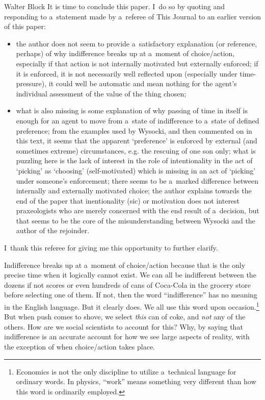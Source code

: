 \begin{artengenv}{Walter Block}
It is time to conclude this paper. I~do so by quoting and responding to a~statement made by a~referee of This Journal to an earlier version of this paper:
\small{
\begin{itemize}
\item the author does not seem to provide a~satisfactory explanation (or reference, perhaps) of why indifference breaks up at a~moment of choice/action, especially if that action is not internally motivated but externally enforced; if it is enforced, it is not necessarily well reflected upon (especially under time-pressure), it could well be automatic and mean nothing for the agent's individual assessment of the value of the thing chosen;
\item what is also missing is some explanation of why passing of time in itself is enough for an agent to move from a~state of indifference to a~state of defined preference; from the examples used by Wysocki, and then commented on in this text, it seems that the apparent ‘preference' is enforced by external (and sometimes extreme) circumstances, e.g. the rescuing of one son only; what is puzzling here is the lack of interest in the role of intentionality in the act of ‘picking' as ‘choosing' (self-motivated) which is missing in an act of ‘picking' under someone's enforcement; there seems to be a~marked difference between internally and externally motivated choice; the author explains towards the end of the paper that inentionality (sic) or motivation does not interest praxeologists who are merely concerned with the end result of a~decision, but that seems to be the core of the misunderstanding between Wysocki and the author of the rejoinder.
\end{itemize}
}
I~thank this referee for giving me this opportunity to further clarify.

Indifference breaks up at a~moment of choice/action because that is the only precise time when it logically cannot exist. We can all be indifferent between the dozens if not scores or even hundreds of cans of Coca-Cola in the grocery store before selecting one of them. If not, then the word ``indifference'' has no meaning in the English language. But it clearly does. We all use this word upon occasion.\footnote{Economics is not the only discipline to utilize a~technical language for ordinary words. In physics, ``work'' means something very different than how this word is ordinarily employed.} But when push comes to shove, we select \textit{this} can of coke, and \textit{not} any of the others. How are we social scientists to account for this? Why, by saying that indifference is an accurate account for how we see large aspects of reality, with the exception of when choice/action takes place.


\end{artengenv}
